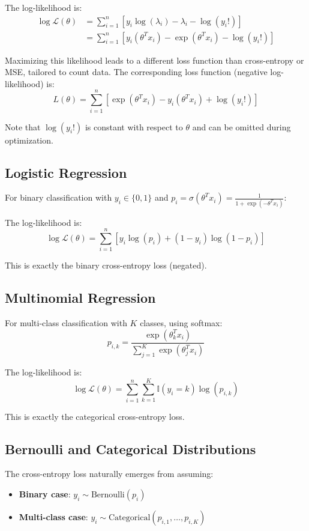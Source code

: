 \begin{notechapter}
The log-likelihood is:
\begin{align*}
\log \mathcal{L}(\theta) &= \sum_{i=1}^n \left[ y_i \log(\lambda_i) - \lambda_i - \log(y_i!) \right] \\
&= \sum_{i=1}^n \left[ y_i (\theta^T x_i) - \exp(\theta^T x_i) - \log(y_i!) \right]
\end{align*}

Maximizing this likelihood leads to a different loss function than cross-entropy or MSE, tailored to count data. The corresponding loss function (negative log-likelihood) is:
\[
L(\theta) = \sum_{i=1}^n \left[ \exp(\theta^T x_i) - y_i (\theta^T x_i) + \log(y_i!) \right]
\]

Note that $\log(y_i!)$ is constant with respect to $\theta$ and can be omitted during optimization.
\subsection{Logistic Regression}

For binary classification with $y_i \in \{0,1\}$ and $p_i = \sigma(\theta^T x_i) = \frac{1}{1 + \exp(-\theta^T x_i)}$:

The log-likelihood is:
\[
\log \mathcal{L}(\theta) = \sum_{i=1}^n \left[ y_i \log(p_i) + (1-y_i) \log(1-p_i) \right]
\]

This is exactly the binary cross-entropy loss (negated).

\subsection{Multinomial Regression}

For multi-class classification with $K$ classes, using softmax:
\[
p_{i,k} = \frac{\exp(\theta_k^T x_i)}{\sum_{j=1}^K \exp(\theta_j^T x_i)}
\]

The log-likelihood is:
\[
\log \mathcal{L}(\theta) = \sum_{i=1}^n \sum_{k=1}^K \mathbb{I}(y_i = k) \log(p_{i,k})
\]

This is exactly the categorical cross-entropy loss.

\subsection{Bernoulli and Categorical Distributions}

The cross-entropy loss naturally emerges from assuming:
\begin{itemize}
    \item \textbf{Binary case}: $y_i \sim \text{Bernoulli}(p_i)$
    \item \textbf{Multi-class case}: $y_i \sim \text{Categorical}(p_{i,1}, \ldots, p_{i,K})$
\end{itemize}


\end{notechapter}
